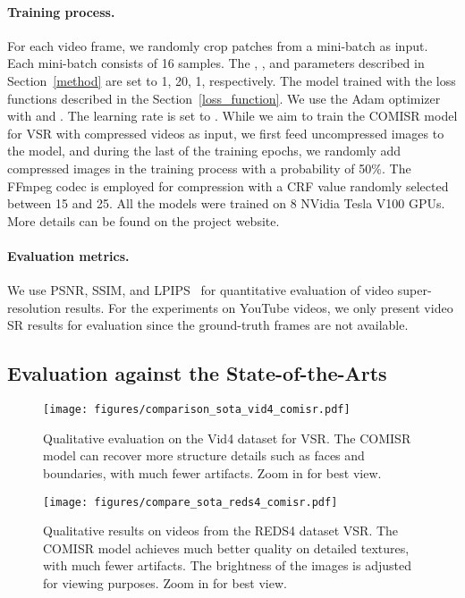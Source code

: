 \vspace{-4mm}
\paragraph{Training process.} For each video frame, we randomly crop  patches from a mini-batch as input.
Each mini-batch consists of 16 samples. 
The , , and  parameters described in Section~\ref{method} are set to 1, 20, 1, respectively.
The model trained with the loss functions described in the Section~\ref{loss_function}. 
We use the Adam optimizer~\cite{adam_opt} with  and . 
The learning rate is set to .
While we aim to train the COMISR model for VSR with compressed videos as input, we first feed uncompressed images to the model, and 
during the last  of the training epochs, 
we randomly add compressed images in the training process with a probability of 50\%.  
The FFmpeg codec is employed for compression with a CRF value randomly selected between 15 and 25.
All the models were trained on 8 NVidia Tesla V100 GPUs.
More details can be found on the project website. 


\vspace{-4mm}
\paragraph{Evaluation metrics.} 
We use PSNR, SSIM, and LPIPS~\cite{zhang2018perceptual} for quantitative evaluation of video super-resolution results. 
For the experiments on YouTube videos, we only present video SR results for evaluation since the ground-truth frames are not available.  


\subsection{Evaluation against the State-of-the-Arts}
\label{compsota}


\begin{figure*}[!htb]
\centering
\texttt{[image: figures/comparison\_sota\_vid4\_comisr.pdf]}
\caption{Qualitative evaluation on the Vid4 dataset for  VSR.
The COMISR model can recover more structure details such as faces and boundaries, with much fewer artifacts. Zoom in for best view.
}
\label{fig:vid4_sota}
\end{figure*}

\begin{figure*}[!htb]
\centering
\texttt{[image: figures/compare\_sota\_reds4\_comisr.pdf]}
\caption{Qualitative results on videos from the REDS4 dataset  VSR.
The COMISR model achieves much better quality on detailed textures, with much fewer artifacts. 
The brightness of the images is adjusted for viewing purposes. 
Zoom in for best view.}
\vspace{-0.3cm}
\label{fig:reds4_sota}
\end{figure*}


